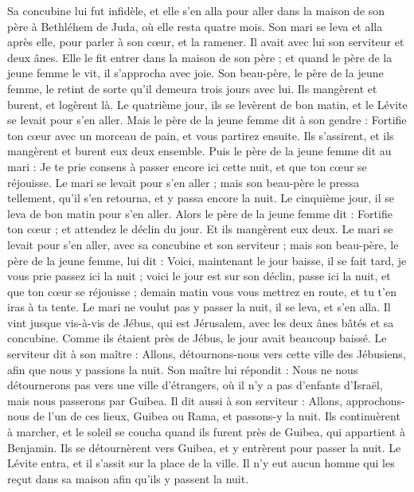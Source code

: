 \begin{multicols}{2}
Sa concubine lui fut infidèle, et elle s'en alla pour aller dans la maison de son père à Bethléhem de Juda, où elle resta quatre mois.
Son mari se leva et alla après elle, pour parler à son cœur, et la ramener. Il avait avec lui son serviteur et deux ânes. Elle le fit entrer dans la maison de son père ; et quand le père de la jeune femme le vit, il s'approcha avec joie.
Son beau-père, le père de la jeune femme, le retint de sorte qu'il demeura trois jours avec lui. Ils mangèrent et burent, et logèrent là.
Le quatrième jour, ils se levèrent de bon matin, et le Lévite se levait pour s'en aller. Mais le père de la jeune femme dit à son gendre : Fortifie ton cœur avec un morceau de pain, et vous partirez ensuite.
Ils s'assirent, et ils mangèrent et burent eux deux ensemble. Puis le père de la jeune femme dit au mari : Je te prie consens à passer encore ici cette nuit, et que ton cœur se réjouisse.
Le mari se levait pour s'en aller ; mais son beau-père le pressa tellement, qu'il s'en retourna, et y passa encore la nuit.
Le cinquième jour, il se leva de bon matin pour s'en aller. Alors le père de la jeune femme dit : Fortifie ton cœur ; et attendez le déclin du jour. Et ils mangèrent eux deux.
Le mari se levait pour s'en aller, avec sa concubine et son serviteur ; mais son beau-père, le père de la jeune femme, lui dit : Voici, maintenant le jour baisse, il se fait tard, je vous prie passez ici la nuit ; voici le jour est sur son déclin, passe ici la nuit, et que ton cœur se réjouisse ; demain matin vous vous mettrez en route, et tu t'en iras à ta tente.
Le mari ne voulut pas y passer la nuit, il se leva, et s'en alla.  Il vint jusque vis-à-vis de Jébus, qui est Jérusalem, avec les deux ânes bâtés et sa concubine.
Comme ils étaient près de Jébus, le jour avait beaucoup baissé. Le serviteur dit à son maître : Allons, détournons-nous vers cette ville des Jébusiens, afin que nous y passions la nuit.
Son maître lui répondit : Nous ne nous détournerons pas vers une ville d'étrangers, où il n'y a pas d'enfants d'Israël, mais nous passerons par Guibea.
Il dit aussi à son serviteur : Allons, approchons-nous de l'un de ces lieux, Guibea ou Rama, et passons-y la nuit.
Ils continuèrent à marcher, et le soleil se coucha quand ils furent près de Guibea, qui appartient à Benjamin.
Ils se détournèrent vers Guibea, et y entrèrent pour passer la nuit. Le Lévite entra, et il s'assit sur la place de la ville. Il n'y eut aucun homme qui les reçut dans sa maison afin qu'ils y passent la nuit.

\end{multicols}
